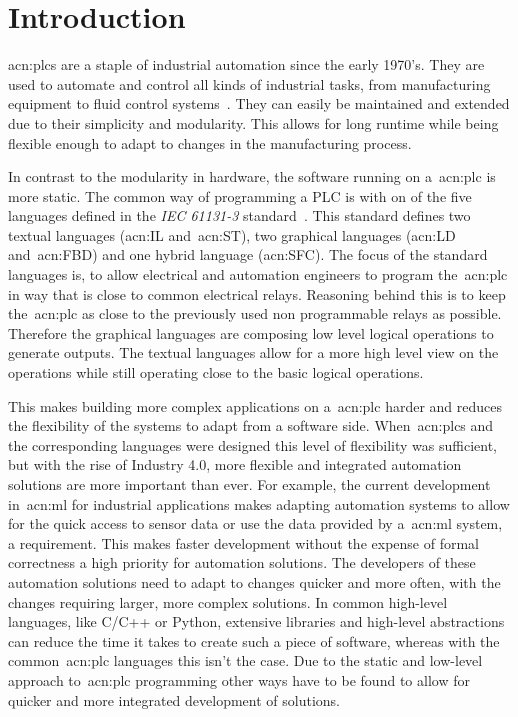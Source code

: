 
\section{Introduction}
\label{sec:Introduction}

\glspl{acn:plc} are a staple of industrial automation since the early 1970's.
They are used to automate and control all kinds of industrial tasks, from manufacturing equipment to fluid control systems~\cite{Erickson:1996aa}.
They can easily be maintained and extended due to their simplicity and modularity.
This allows for long runtime while being flexible enough to adapt to changes in the manufacturing process.

In contrast to the modularity in hardware, the software running on a~\gls{acn:plc} is more static.
The common way of programming a PLC is with on of the five languages defined in the \textit{IEC 61131-3} standard~\cite{Plcopen:61131-3}.
This standard defines two textual languages (\gls{acn:IL} and~\gls{acn:ST}), two graphical languages (\gls{acn:LD} and~\gls{acn:FBD}) and one hybrid language (\gls{acn:SFC}).
The focus of the standard languages is, to allow electrical and automation engineers to program the~\gls{acn:plc} in way that is close to common electrical relays.
Reasoning behind this is to keep the~\gls{acn:plc} as close to the previously used non programmable relays as possible.
Therefore the graphical languages are composing low level logical operations to generate outputs.
The textual languages allow for a more high level view on the operations while still operating close to the basic logical operations.

This makes building more complex applications on a~\gls{acn:plc} harder and reduces the flexibility of the systems to adapt from a software side.
When~\glspl{acn:plc} and the corresponding languages were designed this level of flexibility was sufficient, but with the rise of Industry 4.0, more flexible and integrated automation solutions are more important than ever.
For example, the current development in~\gls{acn:ml} for industrial applications makes adapting automation systems to allow for the quick access to sensor data or use the data provided by a~\gls{acn:ml} system, a requirement.
This makes faster development without the expense of formal correctness a high priority for automation solutions.
The developers of these automation solutions need to adapt to changes quicker and more often, with the changes requiring larger, more complex solutions.
In common high-level languages, like C/C++ or Python, extensive libraries and high-level abstractions can reduce the time it takes to create such a piece of software, whereas with the common~\gls{acn:plc} languages this isn't the case.
Due to the static and low-level approach to~\gls{acn:plc} programming other ways have to be found to allow for quicker and more integrated development of solutions.

